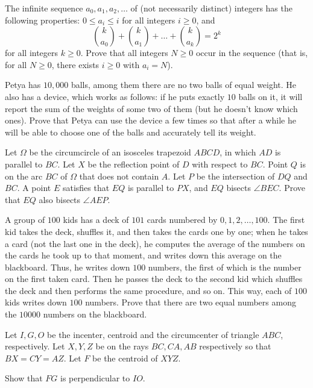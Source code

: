\documentclass[11pt]{scrartcl}
\begin{document}
\begin{problem}[2134021625648303394]
The infinite sequence $a_0,a _1, a_2, \dots$ of (not necessarily distinct) integers has the following properties: $0\le a_i \le i$ for all integers $i\ge 0$, and\[\binom{k}{a_0} + \binom{k}{a_1} + \dots + \binom{k}{a_k} = 2^k\]for all integers $k\ge 0$. Prove that all integers $N\ge 0$ occur in the sequence (that is, for all $N\ge 0$, there exists $i\ge 0$ with $a_i=N$).
\end{problem}
\begin{problem}[561375932085594939]
Petya has $10, 000$ balls, among them there are no two balls of equal weight. He also has a device, which works as follows: if he puts exactly $10$ balls on it, it will report the sum of the weights of some two of them (but he doesn't know which ones). Prove that Petya can use the device a few times so that after a while he will be able to choose one of the balls and accurately tell its weight.
\end{problem}
\begin{problem}[165465510156789]
	Let $\Omega$ be the circumcircle of an isosceles trapezoid $ABCD$, in which $AD$ is parallel to $BC$. Let $X$ be the reflection point of $D$ with respect to $BC$. Point $Q$ is on the arc $BC$ of $\Omega$ that does not contain $A$. Let $P$ be the intersection of $DQ$ and $BC$. A point $E$ satisfies that $EQ$ is parallel to $PX$, and $EQ$ bisects $\angle BEC$. Prove that $EQ$ also bisects $\angle AEP$.
\end{problem}
\begin{problem}[4000488814786935591]
A group of $100$ kids has a deck of $101$ cards numbered by $0, 1, 2,\dots, 100$. The first kid takes the deck, shuffles it, and then takes the cards one by one; when he takes a card (not the last one in the deck), he computes the average of the numbers on the cards he took up to that moment, and writes down this average on the blackboard. Thus, he writes down $100$ numbers, the first of which is the number on the first taken card. Then he passes the deck to the second kid which shuffles the deck and then performs the same procedure, and so on. This way, each of $100$ kids writes down $100$ numbers. Prove that there are two equal numbers among the $10000$ numbers on the blackboard.
\end{problem}
\begin{problem}[6734490609685717062]
	Let $I,G,O$ be the incenter, centroid and the circumcenter of triangle $ABC$, respectively. Let $X,Y,Z$ be on the rays $BC, CA, AB$ respectively so that $BX=CY=AZ$. Let $F$ be the centroid of $XYZ$.

Show that $FG$ is perpendicular to $IO$.
\end{problem}
\end{document}
